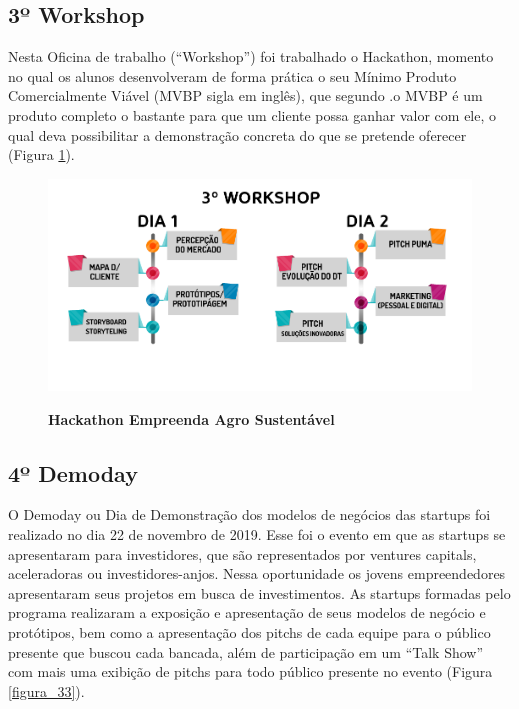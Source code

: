 \subsection{3º Workshop}
 
Nesta Oficina de trabalho (“Workshop”) foi trabalhado o Hackathon, momento no qual os alunos desenvolveram de forma prática o seu Mínimo Produto Comercialmente Viável (MVBP sigla em inglês), que segundo .o MVBP é um produto completo o bastante para que um cliente possa ganhar valor com ele, o qual deva possibilitar a demonstração concreta do que se pretende oferecer (Figura \ref{figura_32}).

\begin{figure}[H]
\centering
\caption{\textbf{Hackathon Empreenda Agro Sustentável}}
\includegraphics[scale=0.45]{Imagens/workshop-03.png}
\label{figura_32}
\end{figure}

\subsection{4º Demoday}

O Demoday ou Dia de Demonstração dos modelos de negócios das startups foi realizado no dia 22 de novembro de 2019. Esse foi o evento em que as startups se apresentaram para investidores, que são representados por ventures capitals, aceleradoras ou investidores-anjos. Nessa oportunidade os jovens empreendedores apresentaram seus projetos em busca de investimentos. As startups formadas pelo programa realizaram a exposição e apresentação de seus modelos de negócio e protótipos, bem como a apresentação dos pitchs de cada equipe para o público presente que buscou cada bancada, além de participação em um “Talk Show” com mais uma exibição de pitchs para todo público presente no evento (Figura \ref{figura_33}).

